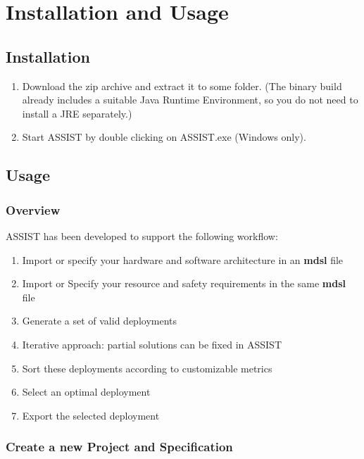 
\chapter{Installation and Usage}
\label{cha:installation-and-usage}

\section{Installation}

\begin{enumerate}
\item Download the zip archive and extract it to some folder. 
      (The binary build already includes a suitable Java Runtime Environment, so you do not need to install a JRE separately.)
    \item Start ASSIST by double clicking on ASSIST.exe (Windows only).
\end{enumerate}

\section{Usage}

\subsection{Overview}

ASSIST has been developed to support the following workflow:

\begin{enumerate}
\item Import or specify your hardware and software architecture in an \textbf{mdsl} file
\item Import or Specify your resource and safety requirements in the same \textbf{mdsl} file
\item Generate a set of valid deployments 
\item Iterative approach: partial solutions can be fixed in ASSIST
\item Sort these deployments according to customizable metrics
\item Select an optimal deployment 
\item Export the selected deployment
\end{enumerate}

\subsection{Create a new Project and Specification}

